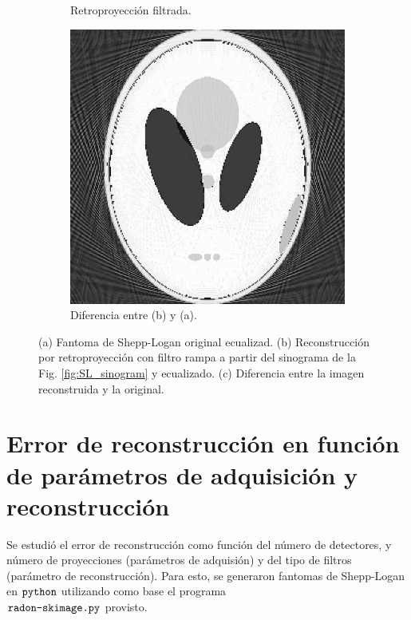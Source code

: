 \documentclass[letterpaper,12pt]{article}
\theoremstyle{plain}
\begin{document}
\begin{figure}[H]
\begin{subfigure}[h]{0.32\linewidth}
           \caption{Retroproyección filtrada.}
           \label{fig:reconstruccion}
        \end{subfigure}
        \begin{subfigure}[h]{0.32\linewidth}
         \centering
         \includegraphics[width=\textwidth]{Figuras/sustraction.png}
         \caption{Diferencia entre (b) y (a).}
         \label{fig:resta}
      \end{subfigure}
   \caption{(a) Fantoma de Shepp-Logan original ecualizad. (b) Reconstrucción por retroproyección con filtro rampa a partir del sinograma de la Fig. \ref{fig:SL_sinogram} y ecualizado. (c) Diferencia entre la imagen reconstruida y la original.}
   \label{fig:sustraction}
\end{figure}

\section{Error de reconstrucción en función de parámetros de adquisición y reconstrucción}

Se estudió el error de reconstrucción como función del número de detectores, y número de proyecciones (parámetros de adquisión) y del tipo de filtros (parámetro de reconstrucción). Para esto, se generaron fantomas de Shepp-Logan en $\verb|python|$ utilizando como base el programa \\$\verb|radon-skimage.py|$ provisto. 
\end{document}
